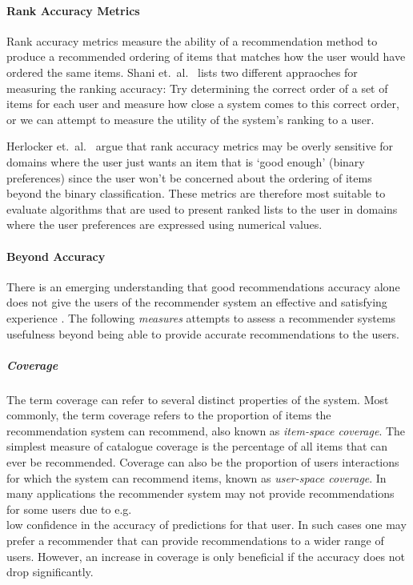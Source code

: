 \paragraph{Rank Accuracy Metrics}

Rank accuracy metrics measure the ability of a recommendation method to produce
a recommended ordering of items that matches how the user would have ordered
the same items. Shani et.\ al.~\cite{Shani2011} lists two different appraoches
for measuring the ranking accuracy: Try determining the correct order of a set
of items for each user and measure how close a system comes to this correct
order, or we can attempt to measure the utility of the system's ranking to a
user.

Herlocker et.\ al.~\cite{Herlocker2004} argue that rank accuracy metrics may be
overly sensitive for domains where the user just wants an item that is `good
enough' (binary preferences) since the user won't be concerned about the
ordering of items beyond the binary classification. These metrics are therefore
most suitable to evaluate algorithms that are used to present ranked lists to
the user in domains where the user preferences are expressed using numerical
values.

\paragraph{Beyond Accuracy}

There is an emerging understanding that good recommendations accuracy alone does not give the users of the recommender system an effective and satisfying experience \cite{Herlocker2004}. The following \emph{measures} attempts to assess a recommender systems usefulness beyond being able to provide accurate recommendations to the users.

\subparagraph{Coverage}

The term coverage can refer to several distinct properties of the system. Most
commonly, the term coverage refers to the proportion of items the
recommendation system can recommend, also known as \emph{item-space coverage}.
The simplest measure of catalogue coverage is the percentage of all items that
can ever be recommended. Coverage can also be the proportion of users
interactions for which the system can recommend items, known as
\emph{user-space coverage}. In many applications the recommender system may not
provide recommendations for some users due to e.g.\\ low confidence in the
accuracy of predictions for that user. In such cases one may prefer a
recommender that can provide recommendations to a wider range of users. However, an increase in coverage is only beneficial if the accuracy does not drop significantly.

